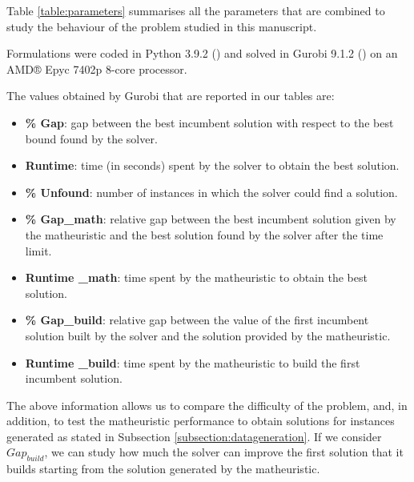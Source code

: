 \documentclass[a4paper,  review, authoryear, 1p.]{elsarticle}
\newcommand{\CV}[1]{{\color{blue}#1}}
\begin{document}
		\CV{Table \ref{table:parameters} summarises all the parameters that are combined to study the behaviour of the problem studied in this manuscript.}
		
		

		Formulations were coded in Python 3.9.2 (\citet{g.vanrossumguido1995}) and solved in Gurobi 9.1.2 (\citet{gurobioptimizationllc2022a}) on an AMD® Epyc 7402p 8-core processor. 
		
		\CV{
		The values obtained by Gurobi that are reported in our tables are:
		\begin{itemize}
			\item \textbf{\% Gap}: gap between the best incumbent solution with respect to the best bound found by the solver.
			\item \textbf{Runtime}: time (in seconds) spent by the solver to obtain the best solution.
			\item \textbf{\% Unfound}: number of instances in which the solver could find a solution.
			\item \textbf{\% Gap\_{math}}: relative gap between the best incumbent solution given by the matheuristic and the best solution found by the solver after the time limit.
			\item \textbf{Runtime \_{math}}: time spent by the matheuristic to obtain the best solution.
			\item \textbf{\% Gap\_{build}}: relative gap between the value of the first incumbent solution built by the solver and the solution provided by the matheuristic.
			\item \textbf{Runtime \_{build}}: time spent by the matheuristic to build the first incumbent solution.
		\end{itemize}
		
		The above information allows us to compare the difficulty of the problem, and, in addition, to test the matheuristic performance to obtain solutions for instances generated as stated in Subsection \ref{subsection:datageneration}. If we consider $Gap_{build}$, we can study how much the solver can improve the first solution that it builds starting from the solution generated by the matheuristic.}
		
\end{document}
